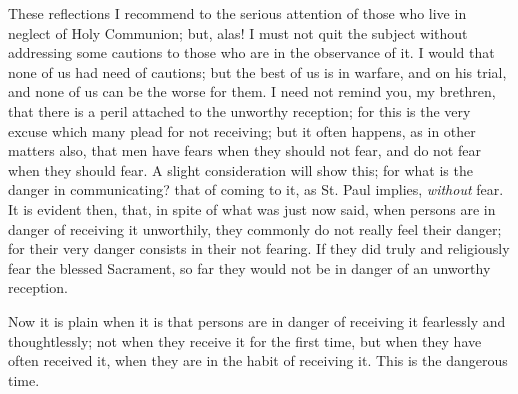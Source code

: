 These reflections I recommend to the serious attention of those who
live in neglect of Holy Communion; but, alas! I must not quit the
subject without addressing some cautions to those who are in the
observance of it. I would that none of us had need of cautions; but
the best of us is in warfare, and on his trial, and none of us can be
the worse for them. I need not remind you, my brethren, that there is
a peril attached to the unworthy reception; for this is the very
excuse which many plead for not receiving; but it often happens, as in
other matters also, that men have fears when they should not fear, and
do not fear when they should fear. A slight consideration will show
this; for what is the danger in communicating? that of coming to it,
as St. Paul implies, \emph{without} fear. It is evident then, that, in
spite of what was just now said, when persons are in danger of
receiving it unworthily, they commonly do not really feel their
danger; for their very danger consists in their not fearing. If they
did truly and religiously fear the blessed Sacrament, so far they
would not be in danger of an unworthy reception.

Now it is plain when it is that persons are in danger of receiving
it fearlessly and thoughtlessly; not when they receive it for the
first time, but when they have often received it, when they are in the
habit of receiving it. This is the dangerous time.

